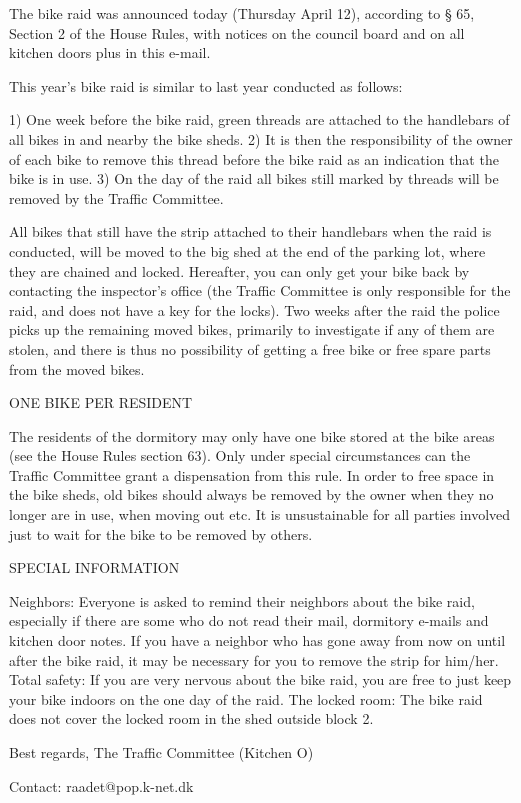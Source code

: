 The bike raid was announced today (Thursday April 12), according to § 65, Section 2 of the House Rules, with notices on the council board and on all kitchen doors plus in this e-mail.

This year’s bike raid is similar to last year conducted as follows:

1) One week before the bike raid, green threads are attached to the handlebars of all bikes in and nearby the bike sheds.
2) It is then the responsibility of the owner of each bike to remove this thread before the bike raid as an indication that the bike is in use.
3) On the day of the raid all bikes still marked by threads will be removed by the Traffic Committee.

All bikes that still have the strip attached to their handlebars when the raid is conducted, will be moved to the big shed at the end of the parking lot, where they are chained and locked. Hereafter, you can only get your bike back by contacting the inspector's office (the Traffic Committee is only responsible for the raid, and does not have a key for the locks). Two weeks after the raid the police picks up the remaining moved bikes, primarily to investigate if any of them are stolen, and there is thus no possibility of getting a free bike or free spare parts from the moved bikes.


ONE BIKE PER RESIDENT

The residents of the dormitory may only have one bike stored at the bike areas (see the House Rules section 63). Only under special circumstances can the Traffic Committee grant a dispensation from this rule. In order to free space in the bike sheds, old bikes should always be removed by the owner when they no longer are in use, when moving out etc. It is unsustainable for all parties involved just to wait for the bike to be removed by others.


SPECIAL INFORMATION

Neighbors: Everyone is asked to remind their neighbors about the bike raid, especially if there are some who do not read their mail, dormitory e-mails and kitchen door notes. If you have a neighbor who has gone away from now on until after the bike raid, it may be necessary for you to remove the strip for him/her.
Total safety: If you are very nervous about the bike raid, you are free to just keep your bike indoors on the one day of the raid.
The locked room: The bike raid does not cover the locked room in the shed outside block 2.
 

Best regards,
The Traffic Committee (Kitchen O)

Contact: raadet@pop.k-net.dk